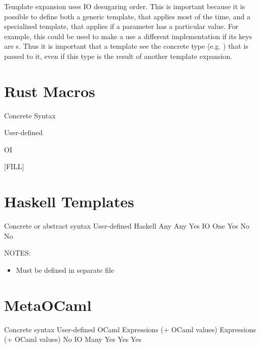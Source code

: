 Template expansion uses IO desugaring order. This is important because
it is possible
to define both a generic template, that applies most of the time, and
a specialized template, that applies if a parameter has a particular
value. For example, this could be used to make a  use a different
implementation if its keys are s. Thus it is important that
a template see the concrete type (e.g. ) that is passed to
it, even if this type is the result of another template expansion.


\section{Rust Macros} \label{sec:rust}

 Concrete Syntax

 User-defined

 OI

 [FILL]



\section{Haskell Templates} \label{sec:haskell}

 Concrete or abstract syntax
 User-defined
 Haskell
 Any
 Any
 Yes
 IO
 One
 Yes
 No
 No

NOTES:
\begin{itemize}
  \item Must be defined in separate file
\end{itemize}


\section{MetaOCaml} \label{sec:metaocaml}

 Concrete syntax
 User-defined
 OCaml
 Expressions (+ OCaml values)
 Expressions (+ OCaml values)
 No
 IO
 Many
 Yes
 Yes
 Yes

